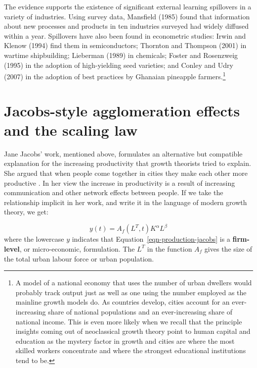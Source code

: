 The evidence supports the existence of significant external learning spillovers in a variety of industries. Using survey data, 
Mansfield (1985)  found that information about new processes and products in ten industries surveyed had widely diffused within a year. Spillovers have also been found in econometric studies: 
Irwin and Klenow (1994)  find them in semiconductors; 
Thornton and Thompson  (2001) in wartime shipbuilding; 
Lieberman (1989)  in chemicals; 
Foster and Rosenzweig (1995)  in the adoption of high-yielding seed varieties; and 
Conley and Udry (2007) 
in the adoption of best practices by Ghanaian pineapple farmers.\footnote{A model of a national economy that uses the number of urban dwellers would probably track output just as well as one using the number employed as the mainline growth models do. As countries develop, cities account for an ever-increasing share of national populations and an ever-increasing share of national income.  This is even more likely when we recall that the principle insights coming out of neoclassical growth theory point to human capital and education as the mystery factor in growth and cities are where the most skilled workers concentrate and where the strongest educational institutions tend to be.} 


\section{Jacobs-style agglomeration effects and the scaling law}\label{section-growth-Jacobs}

Jane Jacobs' work, mentioned above, formulates %
an alternative but compatible explanation for the increasing productivity that growth theorists tried to explain. She argued that when people come together in cities they make each other more productive \cite{jacobsEconomyCities1969}. In her view the increase in productivity is a result of increasing communication and other network effects between people. %
If we take the relationship implicit in her work, and write it in the language of modern growth theory, we get:

\begin{equation}
y(t) = A_f(L^T,t) K^\alpha L^\beta 
\label{eqn-production-jacobs}
\end{equation}
where the  lowercase $y$  indicates that Equation~\ref{eqn-production-jacobs} is a \textbf{firm-level}, or micro-economic, formulation. The $L^T$  in the function $A_f$ gives the size of the total urban labour force or urban population.


